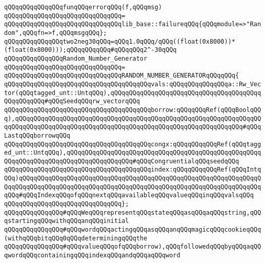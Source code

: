 \verb|qQQqqQQqqQQqqQQqfunqQQqerrorqQQq(f,qQQqmsg)|\newline
\verb|qQQqqQQqqQQqqQQqqQQqqQQqqQQqqQQq=|\newline
\verb|qQQqqQQqqQQqqQQqqQQqqQQqqQQqqQQqlib_base::failureqQQq{qQQqmodule=>"Random",qQQqfn=>f,qQQqmsgqQQq};|\newline
\newline
\verb|qQQqqQQqqQQqqQQqtwo2neg30qQQq=qQQq1.0qQQq/qQQq((float(0x8000))*(float(0x8000)));qQQqqQQqqQQq#qQQqqQQq2^-30qQQq|\newline
\newline
\verb|qQQqqQQqqQQqqQQqRandom_Number_Generator|\newline
\verb|qQQqqQQqqQQqqQQqqQQqqQQqqQQqqQQq=|\newline
\verb|qQQqqQQqqQQqqQQqqQQqqQQqqQQqqQQqRANDOM_NUMBER_GENERATORqQQqqQQq{|\newline
\verb|qQQqqQQqqQQqqQQqqQQqqQQqqQQqqQQqqQQqqQQqvals:qQQqqQQqqQQqqQQqa::Rw_Vector(qQQqtagged_unt::UntqQQq),qQQqqQQqqQQqqQQqqQQqqQQqqQQqqQQqqQQqqQQqqQQqqQQqqQQq#qQQqSeedqQQqrw_vectorqQQq|\newline
\verb|qQQqqQQqqQQqqQQqqQQqqQQqqQQqqQQqqQQqqQQqborrow:qQQqqQQqRef(qQQqBoolqQQq),qQQqqQQqqQQqqQQqqQQqqQQqqQQqqQQqqQQqqQQqqQQqqQQqqQQqqQQqqQQqqQQqqQQqqQQqqQQqqQQqqQQqqQQqqQQqqQQqqQQqqQQqqQQqqQQqqQQqqQQqqQQqqQQqqQQq#qQQqLastqQQqborrowqQQq|\newline
\verb|qQQqqQQqqQQqqQQqqQQqqQQqqQQqqQQqqQQqqQQqcongx:qQQqqQQqqQQqRef(qQQqtagged_unt::UntqQQq),qQQqqQQqqQQqqQQqqQQqqQQqqQQqqQQqqQQqqQQqqQQqqQQqqQQqqQQqqQQqqQQqqQQqqQQqqQQqqQQqqQQqqQQq#qQQqCongruentialqQQqseedqQQq|\newline
\verb|qQQqqQQqqQQqqQQqqQQqqQQqqQQqqQQqqQQqqQQqindex:qQQqqQQqqQQqRef(qQQqIntqQQq)qQQqqQQqqQQqqQQqqQQqqQQqqQQqqQQqqQQqqQQqqQQqqQQqqQQqqQQqqQQqqQQqqQQqqQQqqQQqqQQqqQQqqQQqqQQqqQQqqQQqqQQqqQQqqQQqqQQqqQQqqQQqqQQqqQQqqQQqqQQq#qQQqIndexqQQqofqQQqnextqQQqavailableqQQqvalueqQQqinqQQqvalsqQQq|\newline
\verb|qQQqqQQqqQQqqQQqqQQqqQQqqQQqqQQq};|\newline
\newline
\newline
\verb|qQQqqQQqqQQqqQQq#qQQqWeqQQqrepresentqQQqstateqQQqasqQQqaqQQqstring,qQQqstartingqQQqwithqQQqanqQQqinitial|\newline
\verb|qQQqqQQqqQQqqQQq#qQQqwordqQQqactingqQQqasqQQqanqQQqmagicqQQqcookieqQQq(withqQQqbitqQQq0qQQqdeterminingqQQqthe|\newline
\verb|qQQqqQQqqQQqqQQq#qQQqvalueqQQqofqQQqborrow),qQQqfollowedqQQqbyqQQqaqQQqwordqQQqcontainingqQQqindexqQQqandqQQqaqQQqword|\newline
